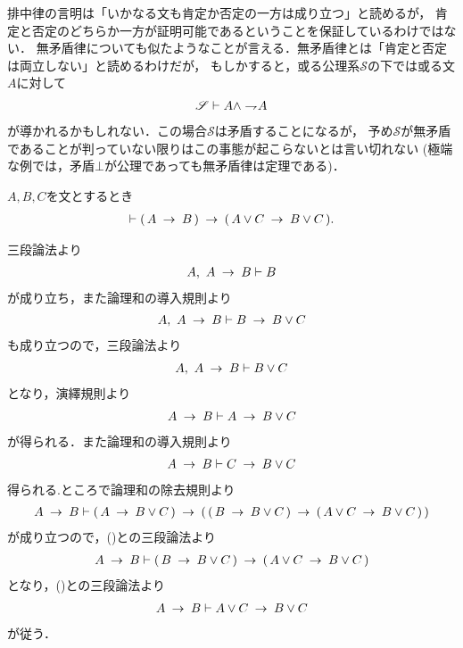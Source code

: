 	排中律の言明は「いかなる文も肯定か否定の一方は成り立つ」と読めるが，
	肯定と否定のどちらか一方が証明可能であるということを保証しているわけではない．
	無矛盾律についても似たようなことが言える．無矛盾律とは「肯定と否定は両立しない」と読めるわけだが，
	もしかすると，或る公理系$\mathscr{S}$の下では或る文$A$に対して
	\begin{align}
		\mathscr{S} \vdash A \wedge \rightharpoondown\hspace{-0.25em} A
	\end{align}
	が導かれるかもしれない．この場合$\mathscr{S}$は矛盾することになるが，
	予め$\mathscr{S}$が無矛盾であることが判っていない限りはこの事態が起こらないとは言い切れない
	(極端な例では，矛盾$\bot$が公理であっても無矛盾律は定理である)．
	
	\begin{screen}
		\begin{logicalthm}[含意の論理和への遺伝性]
		\label{logicalthm:heredity_of_implication_to_disjunction}
			$A,B,C$を文とするとき
			\begin{align}
				\vdash (\, A \hspace{0.25em}\rightarrow\hspace{0.25em} B\, ) \hspace{0.25em}\rightarrow\hspace{0.25em} (\, A \vee C \hspace{0.25em}\rightarrow\hspace{0.25em} B \vee C\, ).
			\end{align}
		\end{logicalthm}
	\end{screen}
	
	\begin{sketch}
		三段論法より
		\begin{align}
			A,\ A \hspace{0.25em}\rightarrow\hspace{0.25em} B \vdash B
		\end{align}
		が成り立ち，また論理和の導入規則より
		\begin{align}
			A,\ A \hspace{0.25em}\rightarrow\hspace{0.25em} B \vdash B \hspace{0.25em}\rightarrow\hspace{0.25em} B \vee C
		\end{align}
		も成り立つので，三段論法より
		\begin{align}
			A,\ A \hspace{0.25em}\rightarrow\hspace{0.25em} B \vdash B \vee C
		\end{align}
		となり，演繹規則より
		\begin{align}
			A \hspace{0.25em}\rightarrow\hspace{0.25em} B \vdash A \hspace{0.25em}\rightarrow\hspace{0.25em} B \vee C
			\label{fom:heredity_of_implication_to_disjunction_1}
		\end{align}
		が得られる．また論理和の導入規則より
		\begin{align}
			A \hspace{0.25em}\rightarrow\hspace{0.25em} B \vdash C \hspace{0.25em}\rightarrow\hspace{0.25em} B \vee C
			\label{fom:heredity_of_implication_to_disjunction_2}
		\end{align}
		得られる.ところで論理和の除去規則より
		\begin{align}
			A \hspace{0.25em}\rightarrow\hspace{0.25em} B \vdash (\, A \hspace{0.25em}\rightarrow\hspace{0.25em} B \vee C\, )
			\hspace{0.25em}\rightarrow\hspace{0.25em} (\, (\, B \hspace{0.25em}\rightarrow\hspace{0.25em} B \vee C\, )
			\hspace{0.25em}\rightarrow\hspace{0.25em} (\, A \vee C \hspace{0.25em}\rightarrow\hspace{0.25em} B \vee C\, )\, )
		\end{align}
		が成り立つので，()との三段論法より
		\begin{align}
			A \hspace{0.25em}\rightarrow\hspace{0.25em} B \vdash (\, B \hspace{0.25em}\rightarrow\hspace{0.25em} B \vee C\, )
			\hspace{0.25em}\rightarrow\hspace{0.25em} (\, A \vee C \hspace{0.25em}\rightarrow\hspace{0.25em} B \vee C\, )
		\end{align}
		となり，()との三段論法より
		\begin{align}
			A \hspace{0.25em}\rightarrow\hspace{0.25em} B \vdash A \vee C \hspace{0.25em}\rightarrow\hspace{0.25em} B \vee C
		\end{align}
		が従う．
		\QED
	\end{sketch}
	
